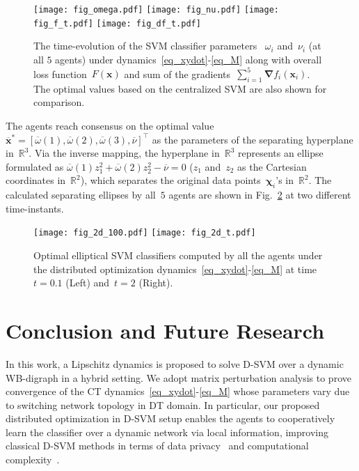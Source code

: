 \documentclass[letterpaper, 10pt, conference]{ieeeconf}
\def\mb{\mathbf}
\begin{document}
\begin{figure}
	\centering
	\texttt{[image: fig\_omega.pdf]}
	\texttt{[image: fig\_nu.pdf]}	
	\texttt{[image: fig\_f\_t.pdf]}
	\texttt{[image: fig\_df\_t.pdf]}		
	\caption{The time-evolution of the SVM classifier parameters ~${\omega}_i$ and~$\nu_i$ (at all $5$ agents) under dynamics~\eqref{eq_xydot}-\eqref{eq_M}  along with overall loss function~$F(\mb{x})$ and sum of the gradients~$\sum_{i=1}^{5} \boldsymbol{ \nabla} f_i(\mb{x}_i)$. The optimal values based on the centralized SVM are also shown for comparison.}
	\label{fig_dynamics}	
\end{figure}
The agents reach consensus on the optimal value ${\overline{\mb{x}}^*=[\overline{\omega}(1),\overline{\omega}(2),\overline{\omega}(3),\overline{\nu}]^\top}$ as the parameters of the separating hyperplane in~$\mathbb{R}^3$. Via the inverse mapping, the hyperplane in~$\mathbb{R}^3$ represents an ellipse formulated as ${\overline{\omega}(1)z_1^2 + \overline{\omega}(2)z_2^2 -\overline{\nu}=0}$ ($z_1$ and~$z_2$ as the Cartesian coordinates in~$\mathbb{R}^2$), which separates the original data points~$\boldsymbol{\chi}_i$'s in~$\mathbb{R}^2$. The calculated separating ellipses by  all~$5$ agents are shown in Fig.~\ref{fig_2d_k} at two different time-instants.  
 \begin{figure}[]
 	\centering
 	\texttt{[image: fig\_2d\_100.pdf]}
 	\hspace{0.5cm}
 	\texttt{[image: fig\_2d\_t.pdf]}	
 	\caption{Optimal elliptical SVM classifiers computed by all the agents under the distributed optimization  dynamics~\eqref{eq_xydot}-\eqref{eq_M}  at time~$t=0.1$ (Left) and~${t=2}$ (Right).}
 	\label{fig_2d_k}
 \end{figure}
\section{Conclusion and Future Research} \label{sec_conclusion}
In this work, a Lipschitz dynamics is proposed to solve D-SVM over a dynamic WB-digraph in a hybrid setting. We adopt matrix perturbation analysis to prove convergence of the CT dynamics~\eqref{eq_xydot}-\eqref{eq_M} whose parameters vary due to  switching network topology in DT domain. In particular, our proposed distributed optimization in D-SVM setup enables the agents to cooperatively learn the classifier over a dynamic network via local information, improving classical D-SVM methods in terms of data privacy~\cite{navia2006distributed,chang2011psvm,bordes2005fast} and computational complexity~\cite{forero2010consensus}.
\end{document}
